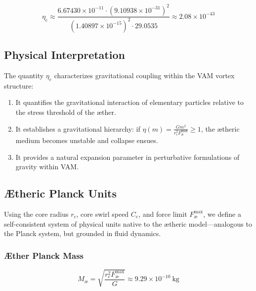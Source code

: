 \documentclass[12pt]{article}
\begin{document}
                \begin{equation}
                \eta_e \approx \frac{6.67430 \times 10^{-11} \cdot (9.10938 \times 10^{-31})^2}{(1.40897 \times 10^{-15})^2 \cdot 29.0535} \approx \boxed{2.08 \times 10^{-43}}
                \end{equation}

                \subsection{Physical Interpretation}

                The quantity \( \eta_e \) characterizes gravitational coupling within the VAM vortex structure:

                \begin{enumerate}
                    \item It quantifies the gravitational interaction of elementary particles relative to the stress threshold of the æther.
                    \item It establishes a gravitational hierarchy: if \( \eta(m) = \frac{G m^2}{r_c^2 F_{\text{\ae}}^{\text{max}}} \geq 1 \), the ætheric medium becomes unstable and collapse ensues.
                    \item It provides a natural expansion parameter in perturbative formulations of gravity within VAM.
                \end{enumerate}

                \subsection{Ætheric Planck Units}

                Using the core radius \( r_c \), core swirl speed \( C_e \), and force limit \( F_{\text{\ae}}^{\text{max}} \), we define a self-consistent system of physical units native to the ætheric model—analogous to the Planck system, but grounded in fluid dynamics.

                \subsubsection*{Æther Planck Mass}
                \begin{equation}
                M_{\text{\ae}} = \sqrt{\frac{r_c^2 F_{\text{\ae}}^{\text{max}}}{G}} \approx \boxed{9.29 \times 10^{-10}~\text{kg}}
                \end{equation}
\end{document}
